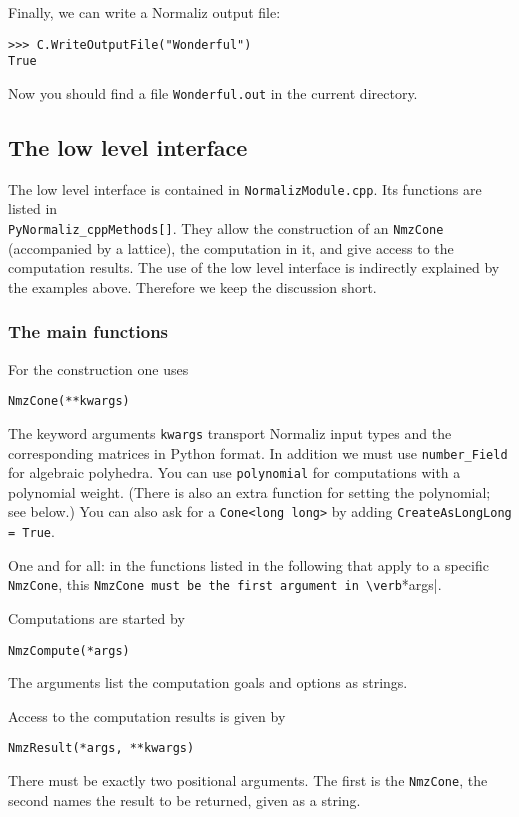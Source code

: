 \documentclass[12pt,a4paper]{scrartcl}
\theoremstyle{definition}
\def\ttt{\texttt}
\begin{document}
\begin{small}
Finally, we can write a Normaliz output file:
\begin{Verbatim}
>>> C.WriteOutputFile("Wonderful")
True
\end{Verbatim}
Now you should find a file \verb|Wonderful.out| in the current directory.

\subsection{The low level interface}

The low level interface is contained in \ttt{NormalizModule.cpp}. Its functions are listed in\\ \verb|PyNormaliz_cppMethods[]|. They allow the construction of an \verb|NmzCone| (accompanied by a lattice), the computation in it, and give access to the computation results. The use of the low level interface is indirectly explained by the examples above. Therefore we keep the discussion short.

\subsubsection{The main functions}

For the construction one uses
\begin{Verbatim}
NmzCone(**kwargs)
\end{Verbatim}
The keyword arguments \ttt{kwargs} transport Normaliz input types and the corresponding matrices in Python format. In addition we must use \ttt{number\_Field} for algebraic polyhedra. You can use \ttt{polynomial} for computations with a polynomial weight. (There is also an extra  function for setting the polynomial; see below.) You can also ask for a \verb|Cone<long long>| by adding \verb|CreateAsLongLong = True|.

One and for all: in the functions listed in the following that apply to a specific \verb|NmzCone|, this \verb|NmzCone must be the first argument in \verb|*args|.

Computations are started by
\begin{Verbatim}
NmzCompute(*args)
\end{Verbatim}
The arguments list the computation goals and options as strings.

Access to the computation results is given by
\begin{Verbatim}
NmzResult(*args, **kwargs)
\end{Verbatim}
There must be exactly two positional arguments. The first is the \verb|NmzCone|, the second names the result to be returned, given as a string. 


\end{small}
\end{document}
